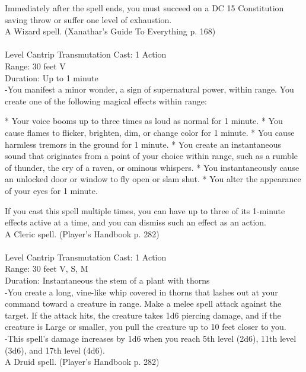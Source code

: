 \documentclass[10pt,twocolumn]{report}
\begin{document}
Immediately after the spell ends, you must succeed on a DC 15 Constitution saving throw or suffer one level of exhaustion.\\
A Wizard spell. (Xanathar's Guide To Everything p. 168) \\


 \\
Level Cantrip \quad Transmutation \quad Cast: 1 Action\\
Range: 30 feet \quad V\\
Duration: Up to 1 minute \quad \\
-You manifest a minor wonder, a sign of supernatural power, within range. You create one of the following magical effects within range:

* Your voice booms up to three times as loud as normal for 1 minute.
* You cause flames to flicker, brighten, dim, or change color for 1 minute.
* You cause harmless tremors in the ground for 1 minute.
* You create an instantaneous sound that originates from a point of your choice within range, such as a rumble of thunder, the cry of a raven, or ominous whispers.
* You instantaneously cause an unlocked door or window to fly open or slam shut.
* You alter the appearance of your eyes for 1 minute.

If you cast this spell multiple times, you can have up to three of its 1-minute effects active at a time, and you can dismiss such an effect as an action.\\
A Cleric spell. (Player's Handbook p. 282) \\


 \\
Level Cantrip \quad Transmutation \quad Cast: 1 Action\\
Range: 30 feet \quad V, S, M\\
Duration: Instantaneous \quad the stem of a plant with thorns\\
-You create a long, vine-like whip covered in thorns that lashes out at your command toward a creature in range. Make a melee spell attack against the target. If the attack hits, the creature takes 1d6 piercing damage, and if the creature is Large or smaller, you pull the creature up to 10 feet closer to you.\\
-This spell’s damage increases by 1d6 when you reach 5th level (2d6), 11th level (3d6), and 17th level (4d6).\\
A Druid spell. (Player's Handbook p. 282) \\
\end{document}

